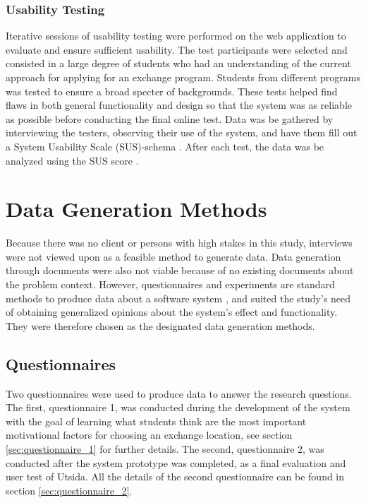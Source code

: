 \subsubsection{Usability Testing}

Iterative sessions of usability testing were performed on the web application to evaluate and ensure sufficient usability. The test participants were selected and consisted in a large degree of students who had an understanding of the current approach for applying for an exchange program. Students from different programs was tested to ensure a broad specter of backgrounds. These tests helped find flaws in both general functionality and design so that the system was as reliable as possible before conducting the final online test. Data was be gathered by interviewing the testers, observing their use of the system, and have them fill out a System Usability Scale (SUS)-schema \cite{brooke1996sus}. After each test, the data was be analyzed using the SUS score \cite{brooke1996sus}.

\section{Data Generation Methods}
Because there was no client or persons with high stakes in this study, interviews were not viewed upon as a feasible method to generate data. Data generation through documents were also not viable because of no existing documents about the problem context. However, questionnaires and experiments are standard methods to produce data about a software system \cite{oates2005researching}, and suited the study's need of obtaining generalized opinions about the system's effect and functionality. They were therefore chosen as the designated data generation methods. 

\subsection{Questionnaires}

Two questionnaires were used to produce data to answer the research questions. The first, questionnaire 1, was conducted during the development of the system with the goal of learning what students think are the most important motivational factors for choosing an exchange location, see section \ref{sec:questionnaire_1} for further details. The second, questionnaire 2, was conducted after the system prototype was completed, as a final evaluation and user test of Utsida. All the details of the second questionnaire can be found in section \ref{sec:questionnaire_2}.

